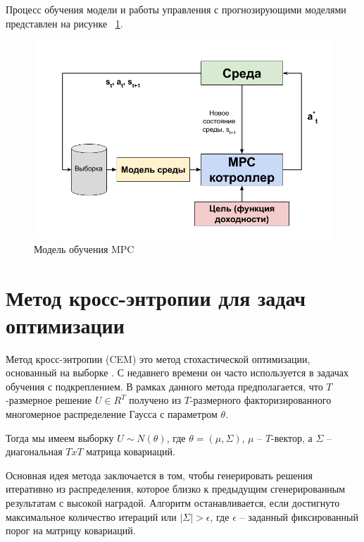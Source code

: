 Процесс обучения модели и работы управления с прогнозирующими моделями представлен на рисунке ~\ref{fig:mpc-m}. \newpage
 
 
 \begin{figure}[h]
 	\centering
 	\includegraphics[scale=0.6]{mpc_model.png}
 	\caption {Модель обучения MPC}
 	\label{fig:mpc-m}
 \end{figure}





\section{Метод кросс-энтропии для задач оптимизации}\label{1sec:optimal-control}

Метод кросс-энтропии (CEM) это метод стохастической оптимизации, основанный на выборке \cite{cem2}. С недавнего времени он часто используется в задачах обучения с подкреплением. В рамках данного метода предполагается, что $T$-размерное решение $U \in R^T$ получено из $T$-размерного факторизированного многомерное распределение Гаусса с параметром $\theta$.

Тогда мы имеем выборку $U \sim N(\theta)$, где $\theta = (\mu, \Sigma)$, $\mu$ --  $T$-вектор, а $\Sigma$ -- диагональная $T x T$ матрица ковариаций.

Основная идея метода заключается в том, чтобы генерировать решения итеративно из распределения, которое близко к предыдущим сгенерированным результатам с высокой наградой. Алгоритм останавливается, если достигнуто максимальное количество итераций или $|\Sigma| > \epsilon$, где $\epsilon$ -- заданный фиксированный порог на матрицу ковариаций. 

